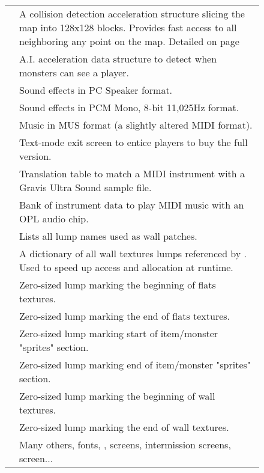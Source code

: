 \begin{figure}[H]
\begin{tabularx}{\textwidth}{ L{0.2}  L{0.8}}
   & A collision detection acceleration structure slicing the map into 128x128 blocks. Provides fast access to all  neighboring any point on the map. Detailed on page \pageref{blockmapdetails} \\
   &  A.I. acceleration data structure to detect when monsters can see a player.\\
  \toprule
   &  Sound effects in PC Speaker format.\\
   &  Sound effects in PCM Mono, 8-bit 11,025Hz format.\\
   & Music in MUS format (a slightly altered MIDI format).\\
  \toprule
   & Text-mode exit screen to entice players to buy the full version. \\
   & Translation table to match a MIDI instrument with a Gravis Ultra Sound sample file.\\
   &  Bank of instrument data to play MIDI music with an OPL audio chip.\\
   &  Lists all lump names used as wall patches.\\
   &  A dictionary of all wall textures lumps referenced by . Used to speed up access and allocation at runtime.\\  
   &  Zero-sized lump marking the beginning of flats textures.\\  
   &   Zero-sized lump marking the end of flats textures.\\  
   & Zero-sized lump marking start of item/monster "sprites" section. \\  
   & Zero-sized lump marking end of item/monster "sprites" section. \\  
   & Zero-sized lump marking the beginning of wall textures.\\
   & Zero-sized lump marking the end of wall textures.\\
   &  Many others, fonts, ,  screens, intermission screens,  screen... \\  
   \toprule
\end{tabularx}
\end{figure}
\par
\pagebreak






